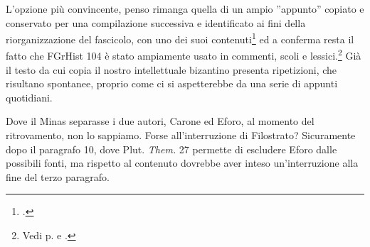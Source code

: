 L'opzione più convincente, penso rimanga quella di un ampio
''appunto'' copiato e conservato per una compilazione successiva e identificato
ai fini della riorganizzazione del fascicolo, con uno dei suoi
contenuti\footnote{\cite[36]{Schepens2010}.} ed a conferma resta il fatto che FGrHist 104 è
stato ampiamente usato in commenti, scoli e lessici.\footnote{Vedi
p.\pageref{bkm:RefHeading704661501267828} e
\pageref{bkm:RefHeading701261501267828}.}
Già il testo da cui copia il nostro intellettuale
bizantino presenta ripetizioni, che risultano
{\textquotedbl}spontanee{\textquotedbl}, proprio come ci si aspetterebbe da una serie di
appunti quotidiani. 


Dove il Minas separasse i due autori, Carone ed Eforo, al
momento del ritrovamento, non lo sappiamo. Forse
all'interruzione di Filostrato? Sicuramente dopo
il paragrafo 10, dove Plut. \textit{Them.} 27
permette di escludere Eforo dalle possibili fonti, ma rispetto
al contenuto dovrebbe aver inteso
un'interruzione alla fine del terzo paragrafo.



